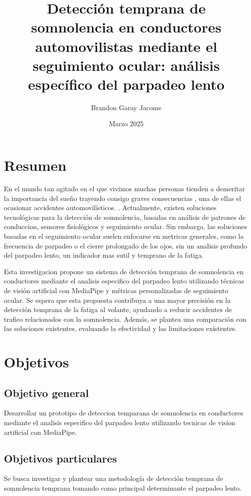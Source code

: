 \documentclass[letterpaper,12pt,oneside]{article}
\title{Detección temprana de somnolencia en conductores automovilistas mediante el seguimiento ocular: análisis específico del parpadeo lento}
\author{Brandon Garay Jacome}
\date{Marzo 2025}
\begin{document}
\maketitle

\section*{Resumen}
En el mundo tan agitado en el que vivimos muchas personas tienden a demeritar la importancia del sueño trayendo consigo graves consecuencias , una de ellas el ocasionar accidentes automovilísticos. \cite{torre}. Actualmente, existen soluciones tecnológicas para la detección de somnolencia, basadas en análisis de patrones de conduccion, sensores fisiológicos y seguimiento ocular.\cite{EspinolaGonzales2011,MendietaZrate2018} Sin embargo, las soluciones basadas en el seguimiento ocular suelen enfocarse en metricas generales, como la frecuencia de parpadeo o el cierre prolongado de los ojos, sin un analisis profundo del parpadeo lento, un indicador mas sutil y temprano de la fatiga.

Esta investigacion propone un sistema de detección temprana de somnolencia en conductores mediante el analisis especifico del parpadeo lento utilizando técnicas de visión artificial con MediaPipe y métricas personalizadas de seguimiento ocular. Se espera que esta propuesta contribuya a una mayor precisión en la detección temprana de la fatiga al volante, ayudando a reducir accidentes de trafico relacionados con la somnolencia. Además, se plantea una comparación con las soluciones existentes, evaluando la efectividad y las limitaciones existentes.




\section{Objetivos}

\subsection{Objetivo general}
Desarrollar un prototipo de deteccion temparana de somnolencia en conductores mediante el analisis especifico del parpadeo lento utilizando tecnicas de vision artificial con MediaPipe.




\subsection{Objetivos particulares}
Se busca investigar y plantear una metodología de detección temprana de somnolencia temprana tomando como principal determinante el parpadeo lento.
\end{document}
